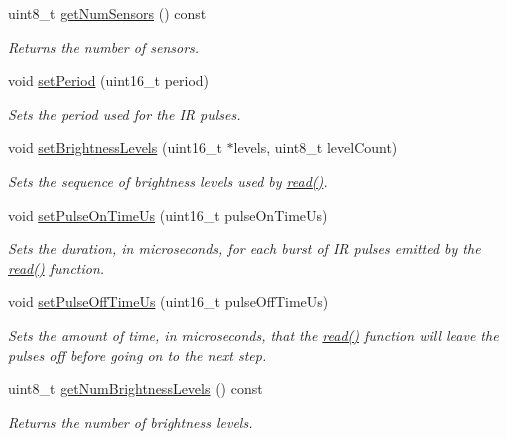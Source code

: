 \begin{DoxyCompactItemize}
uint8\+\_\+t \hyperlink{class_zumo32_u4_proximity_sensors_abf645921ec976cf1b657fccc50b123a1}{get\+Num\+Sensors} () const
\begin{DoxyCompactList}\small\item\em Returns the number of sensors. \end{DoxyCompactList}\item 
void \hyperlink{class_zumo32_u4_proximity_sensors_ab288aeae9bcc5933cede8941b709b4fc}{set\+Period} (uint16\+\_\+t period)
\begin{DoxyCompactList}\small\item\em Sets the period used for the IR pulses. \end{DoxyCompactList}\item 
void \hyperlink{class_zumo32_u4_proximity_sensors_a47820baf67dfa58dedb41cb7bb26dc65}{set\+Brightness\+Levels} (uint16\+\_\+t $\ast$levels, uint8\+\_\+t level\+Count)
\begin{DoxyCompactList}\small\item\em Sets the sequence of brightness levels used by \hyperlink{class_zumo32_u4_proximity_sensors_a071d935e10e2a16a3ae2559d16a12683}{read()}. \end{DoxyCompactList}\item 
void \hyperlink{class_zumo32_u4_proximity_sensors_aeb626f226420976e774d93dd2a83e768}{set\+Pulse\+On\+Time\+Us} (uint16\+\_\+t pulse\+On\+Time\+Us)
\begin{DoxyCompactList}\small\item\em Sets the duration, in microseconds, for each burst of IR pulses emitted by the \hyperlink{class_zumo32_u4_proximity_sensors_a071d935e10e2a16a3ae2559d16a12683}{read()} function. \end{DoxyCompactList}\item 
void \hyperlink{class_zumo32_u4_proximity_sensors_a4d7911aca58734a76be212de103a1387}{set\+Pulse\+Off\+Time\+Us} (uint16\+\_\+t pulse\+Off\+Time\+Us)
\begin{DoxyCompactList}\small\item\em Sets the amount of time, in microseconds, that the \hyperlink{class_zumo32_u4_proximity_sensors_a071d935e10e2a16a3ae2559d16a12683}{read()} function will leave the pulses off before going on to the next step. \end{DoxyCompactList}\item 
uint8\+\_\+t \hyperlink{class_zumo32_u4_proximity_sensors_ab6cf32a103b2eafb16ad051ca499db48}{get\+Num\+Brightness\+Levels} () const
\begin{DoxyCompactList}\small\item\em Returns the number of brightness levels. \end{DoxyCompactList}\item 

\end{DoxyCompactItemize}
